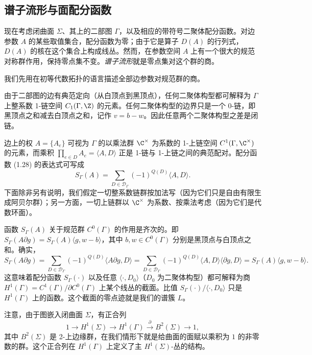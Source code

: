 \subsection{谱子流形与面配分函数}

现在考虑闭曲面 $\Sigma$、其上的二部图 $\Gamma$，以及相应的带符号二聚体配分函数。对边参数 $A$ 的某些取值集合，配分函数为零；由于它是算子 $D(A)$ 的行列式，$D(A)$ 的核在这个集合上构成线丛。然而，在参数空间 $A$ 上有一个很大的规范对称群作用，保持零点集不变。\emph{谱子流形}就是零点集对这个群的商。

我们先用在初等代数拓扑的语言描述全部边参数对规范群的商。

由于二部图的边有典范定向（从白顶点到黑顶点），任何二聚体构型都可解释为 $\Gamma$ 上整系数 1-链空间 $C_1(\Gamma,\Z)$ 的元素。任何二聚体构型的边界只是一个 0-链，即黑顶点之和减去白顶点之和，记作 $v=b-w$。因此任意两个二聚体构型之差是闭链。

边上的权 $A=\{A_e\}$ 可视为 $\Gamma$ 的以乘法群 $\C^\times$ 为系数的 1-上链空间 $C^1(\Gamma,\C^\times)$ 的元素，而乘积 $\prod_{e\in D}A_e=\langle A,D\rangle$ 正是 1-链与 1-上链之间的典范配对。配分函数 (1.28) 的表达式可写成
\[
S_\Gamma(A)=\sum_{D\in\mathcal{D}_\Gamma}(-1)^{Q(D)}\langle A,D\rangle.
\]
下面除非另有说明，我们假定一切整系数链群按加法写（因为它们只是自由有限生成阿贝尔群）；另一方面，一切上链群以 $\C^\times$ 为系数、按乘法考虑（因为它们是代数环面）。

函数 $S_\Gamma(A)$ 关于规范群 $C^0(\Gamma)$ 的作用是齐次的。即 $S_\Gamma(A\partial g)=S_\Gamma(A)\langle g,w-b\rangle$，其中 $b,w\in C^0(\Gamma)$ 分别是黑顶点与白顶点之和。确实，
\[
S_\Gamma(A\partial g)=\sum_{D\in\mathcal{D}_\Gamma}(-1)^{Q(D)}\langle A\partial g,D\rangle
=\sum_{D\in\mathcal{D}_\Gamma}(-1)^{Q(D)}\langle A,D\rangle\langle\partial g,D\rangle
=S_\Gamma(A)\langle g,w-b\rangle.
\]
这意味着配分函数 $S_\Gamma(\cdot)$ 以及任意 $\langle\cdot,D_0\rangle$（$D_0$ 为二聚体构型）都可解释为商 $H^1(\Gamma)=C^1(\Gamma)/\partial C^0(\Gamma)$ 上某个线丛的截面。比值 $S_\Gamma(\cdot)/\langle\cdot,D_0\rangle$ 只是 $H^1(\Gamma)$ 上的函数。这个截面的零点迹就是我们的谱簇 $L$。

注意，由于图嵌入闭曲面 $\Sigma$，有正合列
\begin{equation}\label{eq:1.30}
1\to H^1(\Sigma)\to H^1(\Gamma)\xrightarrow{\ \partial\ }B^2(\Sigma)\to1,
\tag{1.30}
\end{equation}
其中 $B^2(\Sigma)$ 是 2-上边缘群，在我们情形下就是给曲面的面赋以乘积为 $1$ 的非零数的群。这个正合列在 $H^1(\Gamma)$ 上定义了主 $H^1(\Sigma)$-丛的结构。

